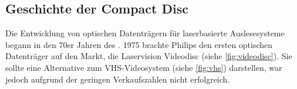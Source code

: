 \subsection{Geschichte der Compact Disc}
\label{subsec:cdgeschichte}

Die Entwicklung von optischen Datenträgern für laserbasierte Auslesesysteme
begann in den 70er Jahren des . 1975 brachte Philips
den ersten optischen Datenträger auf den Markt, die Laservision Videodisc (siehe
\autoref{fig:videodisc}). Sie sollte eine Alternative zum VHS-Videosystem (siehe
\autoref{fig:vhs}) darstellen, war jedoch aufgrund der geringen Verkaufszahlen
nicht erfolgreich.

